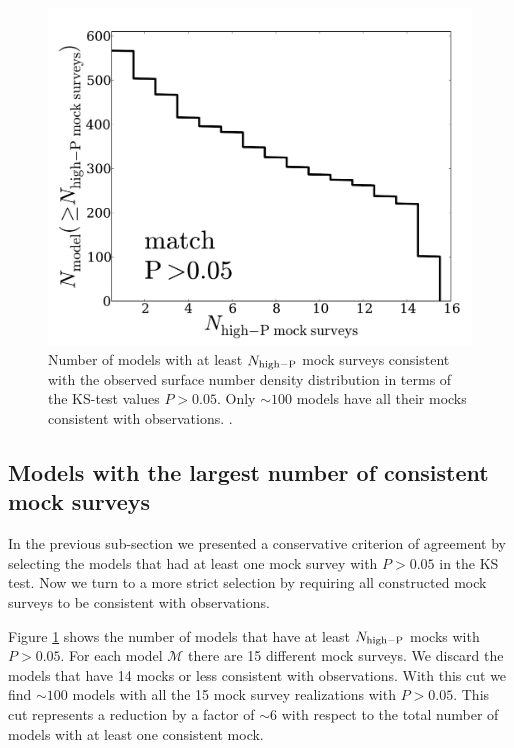 \documentclass[usenatbib]{mn2e}
\begin{document}
{\begin{figure}
\begin{center}
\includegraphics[width=0.95\linewidth,angle=0]{Fig4_match_P5.pdf}
\end{center} 
\caption{ Number of models with at least $N_{\rm high-P}$ mock surveys
  consistent with the observed surface number density
  distribution in terms of the KS-test values $P>0.05$. Only $\sim
  100$ models have all their mocks consistent with observations. 
  \label{fig:high_success_rate}.}  
\end{figure}
 
\subsection{Models with the largest number of consistent mock surveys}

In the previous sub-section we presented a conservative criterion of
agreement by selecting the models that had at least one mock survey
with $P>0.05$ in the KS test. Now we turn to a more strict selection
by requiring all constructed mock surveys to be consistent with
observations. 


Figure \ref{fig:high_success_rate} shows the number of models
that have at least $N_{\rm high-P}$ mocks with $P>0.05$. For each
model ${\mathcal M}$ there are 15 different mock surveys.  We discard
the models that have 14 mocks or less consistent with
observations. With this cut we find $\sim 100$ models with all the 15
mock survey realizations with $P>0.05$.  This cut represents a
reduction by a factor of $\sim 6$ with respect to the total number of
models with at least one consistent mock.   

}
\end{document}
